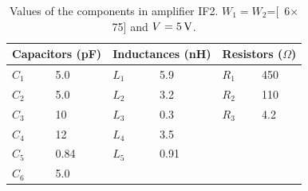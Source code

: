 		\begin{table}[hbt!]
			\caption[Amplifier IF2 component values.]{Values of the components in amplifier IF2. $W_1=W_2$=\unit[6$\times$75]{\mum} and $V=\unit[5]{V}$.}
			\label{tab:if2schvalues}
			\centering
			\begin{tabular}{llllll}
				\multicolumn{2}{l}{Capacitors (pF)} & \multicolumn{2}{l}{Inductances (nH)} & \multicolumn{2}{l}{Resistors ($\Omega$)} \\\hline
				$C_1$ & 5.0  & $L_1$ & 5.9 & $R_1$ & 450 \\
				$C_2$ & 5.0  & $L_2$ & 3.2 & $R_2$ & 110 \\
				$C_3$ & 10   & $L_3$ & 0.3 & $R_3$ & 4.2 \\
				$C_4$ & 12   & $L_4$ & 3.5 &  & \\
				$C_5$ & 0.84 & $L_5$ & 0.91 &  & \\
				$C_6$ & 5.0  &       &      &  &
			\end{tabular}
		\end{table}
	
	\newpage
	
		

		

